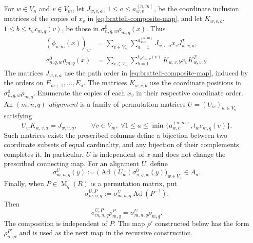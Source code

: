 \documentclass[11pt]{amsart}
\DeclareMathOperator{\Mat}{M}
\DeclareMathOperator{\Ad}{Ad}
\theoremstyle{definition}
\theoremstyle{remark}
\begin{document}
For $w\in V_n$ and $v\in V_m$, let $J_{w,v,a}$,
$1\leq a\leq a_{w,v}^{(n,m)}$, be the coordinate inclusion
matrices of the copies of $x_v$ in \eqref{eq:bratteli-composite-map},
and let $K_{w,v,b}$, $1\leq b\leq t_wc_{m,q}(v)$, be those in
$\sigma_{n,q,w}^0\rho_{m,q}(x)$.
Thus
\begin{equation}\label{eq:alignment-coordinate-copies}
 \begin{aligned}
 (\phi_{n,m}(x))_w
 &=\sum_{v\in V_m}\sum_{a=1}^{a_{w,v}^{(n,m)}}
       J_{w,v,a}x_vJ_{w,v,a}^{T},\\
 \sigma_{n,q,w}^0\rho_{m,q}(x)
 &=\sum_{v\in V_m}\sum_{b=1}^{t_wc_{m,q}(v)}
       K_{w,v,b}x_vK_{w,v,b}^{T}.
 \end{aligned}
\end{equation}
The matrices $J_{w,v,a}$ use the path order in
\eqref{eq:bratteli-composite-map}, induced by the orders on
$E_{m+1},\ldots,E_n$.  The matrices $K_{w,v,b}$ use the coordinate
positions in $\sigma_{n,q,w}^0\rho_{m,q}$.
Enumerate the copies of each $x_v$ in their respective coordinate order.
An \emph{$(m,n,q)$-alignment} is a family of permutation matrices
$U=(U_w)_{w\in V_n}$ satisfying
\begin{equation}\label{eq:alignment-coordinate-match}
 U_wK_{w,v,a}=J_{w,v,a},
 \qquad \forall v\in V_m,\ \forall 1\leq a\leq \min\{a_{w,v}^{(n,m)},t_wc_{m,q}(v)\}.
\end{equation}
Such matrices exist: the prescribed columns define a bijection between
two coordinate subsets of equal cardinality, and any bijection of their
complements completes it.  In particular, $U$ is independent of $x$ and
does not change the prescribed connecting map.
For an alignment $U$, define
\[
 \sigma_{m,n,q}^{U}(y)
 :=\bigl(\Ad(U_w)\sigma_{n,q,w}^0(y)\bigr)_{w\in V_n}
 \in A_n.
\]
Finally, when $P\in\Mat_q(R)$ is a permutation matrix, put
\begin{equation}\label{eq:aligned-packing-P}
 \sigma_{m,n,q}^{U,P}
 :=\sigma_{m,n,q}^{U}\Ad(P^{-1}).
\end{equation}
Then
\[
 \sigma_{m,n,q}^{U,P}\rho_{m,q}^{P}
 =\sigma_{m,n,q}^{U}\rho_{m,q}.
\]
The composition is independent of $P$.  The map $\rho'$ constructed
below has the form $\rho_{n,qr}^{P'}$ and is used as the next map
in the recursive construction.

\medskip
\end{document}

